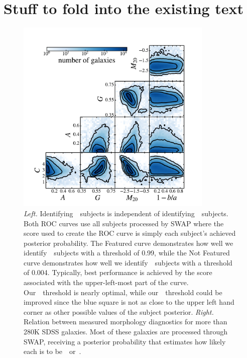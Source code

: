 \section{Stuff to fold into the existing text}

\begin{figure}[t!]
\includegraphics[width=3.7in]{Figures/human_machine/A2b.pdf}
\caption{\textit{Left.} Identifying~\feat~subjects is independent of identifying~\notfeat~subjects.  Both ROC curves use all subjects processed by SWAP where the score used to create the ROC curve is simply each subject's achieved posterior probability. The Featured curve demonstrates how well we identify~\feat~subjects with a threshold of 0.99, while the Not Featured curve demonstrates how well we identify~\notfeat~subjects with a threshold of 0.004. Typically, best performance is achieved by the score associated with the upper-left-most part of the curve. Our~\feat~threshold is nearly optimal, while our~\notfeat~threshold could be improved since the blue square is not as close to the upper left hand corner as other possible values of the subject posterior. \textit{Right.} Relation between measured morphology diagnostics for more than 280K SDSS galaxies. Most of these galaxies are processed through SWAP, receiving a posterior probability that estimates how likely each is to be~\feat~or~\notfeat.}
\label{fig: morph thresh}
\end{figure}
